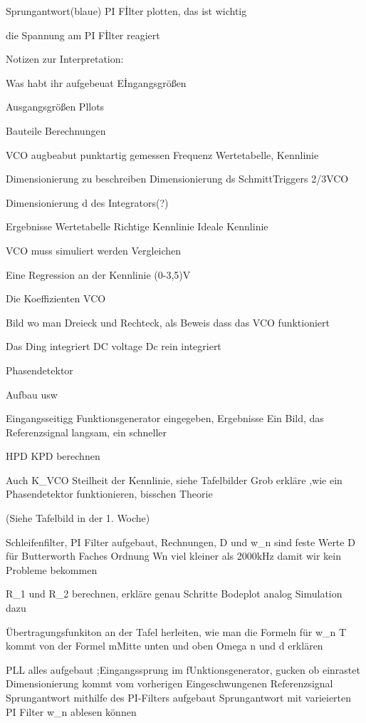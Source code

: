 Sprungantwort(blaue) PI Fİlter plotten, das ist wichtig

die Spannung am PI Fİlter reagiert


Notizen zur Interpretation:

Was habt ihr aufgebeuat
Eİngangsgrößen

Ausgangsgrößen
Pllots

Bauteile Berechnungen


VCO augbeabut punktartig gemessen
Frequenz Wertetabelle, Kennlinie

Dimensionierung zu beschreiben
Dimensionierung ds SchmittTriggers
2/3VCO

Dimensionierung d des Integrators(?)

Ergebnisse
Wertetabelle
Richtige Kennlinie
Ideale Kennlinie

VCO muss simuliert werden
Vergleichen

Eine Regression an der Kennlinie (0-3,5)V

Die Koeffizienten VCO

Bild wo man Dreieck und Rechteck, als Beweis dass das VCO funktioniert


Das Ding integriert DC voltage
Dc rein integriert

Phasendetektor

Aufbau usw

Eingangsseitigg Funktionsgenerator eingegeben, Ergebnisse
Ein Bild, das Referenzsignal langsam, ein schneller

HPD KPD berechnen

Auch K_VCO Steilheit der Kennlinie, siehe Tafelbilder
Grob erkläre ,wie ein Phasendetektor funktionieren, bisschen Theorie

(Siehe Tafelbild in der 1. Woche)

Schleifenfilter, PI Filter aufgebaut, Rechnungen, 
D und w_n sind feste Werte
D für Butterworth Faches  Ordnung
Wn viel kleiner als 2000kHz damit wir kein Probleme bekommen

R_1 und R_2 berechnen, erkläre genau Schritte
Bodeplot analog 
Simulation dazu

Übertragungsfunkiton an der Tafel herleiten, wie man die Formeln für w_n T kommt von der Formel mMitte unten und oben 
Omega n und d erklären

PLL alles aufgebaut
;Eingangssprung im fUnktionsgenerator, gucken ob einrastet
Dimensionierung kommt vom vorherigen 
Eingeschwungenen Referenzsignal
Sprungantwort mithilfe des PI-Filters aufgebaut
Sprungantwort mit varieierten PI Filter
w_n ablesen können


